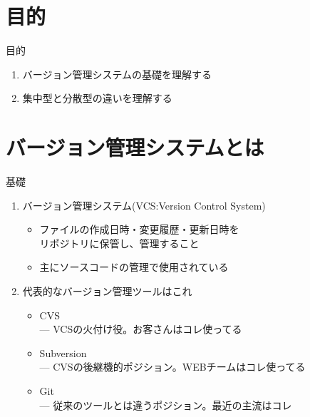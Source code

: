 \documentclass[dvipdfmx]{beamer}
\begin{document}
\section{目的}
\begin{frame}{目的}
\begin{enumerate}
\item \Large{バージョン管理システムの基礎を理解する}
\pause
\vspace{1.5cm}
\item \Large{集中型と分散型の違いを理解する}
\end{enumerate}
\end{frame}

\section{バージョン管理システムとは}
\begin{frame}{基礎}
\begin{enumerate}
\item バージョン管理システム(VCS:Version Control System) \\
\pause
\begin{itemize}
\item ファイルの作成日時・変更履歴・更新日時を\\
リポジトリに保管し、管理すること \\
\pause
\item 主にソースコードの管理で使用されている
\pause
\end{itemize}
\vspace{0.6cm}
\item 代表的なバージョン管理ツールはこれ
\pause
\begin{itemize}
\item CVS \\
--- VCSの火付け役。お客さんはコレ使ってる
\vspace{3mm}
\pause
\item Subversion \\
--- CVSの後継機的ポジション。WEBチームはコレ使ってる
\vspace{3mm}
\pause
\item Git \\
--- 従来のツールとは違うポジション。最近の主流はコレ

\end{itemize}
\end{enumerate}
\end{frame}
\end{document}
